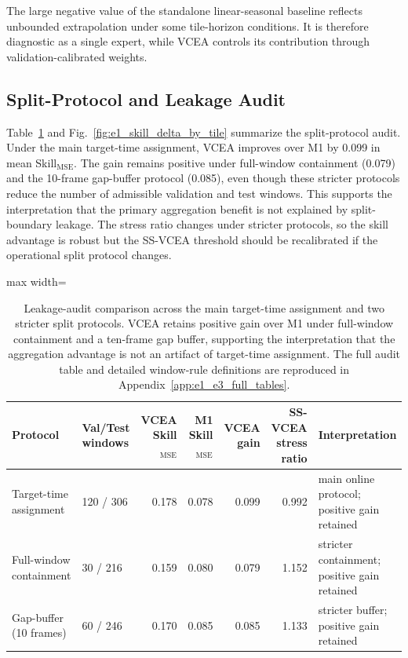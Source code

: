 \documentclass[lettersize,journal]{IEEEtran}
\newcommand{\skillmse}{Skill$_{\mathrm{MSE}}$}
\begin{document}
The large negative value of the standalone linear-seasonal baseline reflects unbounded extrapolation under some tile-horizon conditions. It is therefore diagnostic as a single expert, while VCEA controls its contribution through validation-calibrated weights.

\subsection{Split-Protocol and Leakage Audit}
Table~\ref{tab:e1_leakage_audit} and Fig.~\ref{fig:e1_skill_delta_by_tile} summarize the split-protocol audit. Under the main target-time assignment, VCEA improves over M1 by 0.099 in mean \skillmse{}. The gain remains positive under full-window containment (0.079) and the 10-frame gap-buffer protocol (0.085), even though these stricter protocols reduce the number of admissible validation and test windows. This supports the interpretation that the primary aggregation benefit is not explained by split-boundary leakage. The stress ratio changes under stricter protocols, so the skill advantage is robust but the SS-VCEA threshold should be recalibrated if the operational split protocol changes.

\begin{table}[!t]
\centering
\scriptsize
\begin{adjustbox}{max width=\textwidth}
\begin{tabular}{lp{}rrrrp{}}
\toprule
Protocol & Val/Test windows & VCEA Skill$_{\mathrm{MSE}}$ & M1 Skill$_{\mathrm{MSE}}$ & VCEA gain & SS-VCEA stress ratio & Interpretation \\
\midrule
Target-time assignment & 120 / 306 & 0.178 & 0.078 & 0.099 & 0.992 & main online protocol; positive gain retained \\
Full-window containment & 30 / 216 & 0.159 & 0.080 & 0.079 & 1.152 & stricter containment; positive gain retained \\
Gap-buffer (10 frames) & 60 / 246 & 0.170 & 0.085 & 0.085 & 1.133 & stricter buffer; positive gain retained \\
\bottomrule
\end{tabular}
\end{adjustbox}
\caption{Leakage-audit comparison across the main target-time assignment and two stricter split protocols. VCEA retains positive gain over M1 under full-window containment and a ten-frame gap buffer, supporting the interpretation that the aggregation advantage is not an artifact of target-time assignment. The full audit table and detailed window-rule definitions are reproduced in Appendix~\ref{app:e1_e3_full_tables}.}
\label{tab:e1_leakage_audit}
\end{table}
\end{document}
